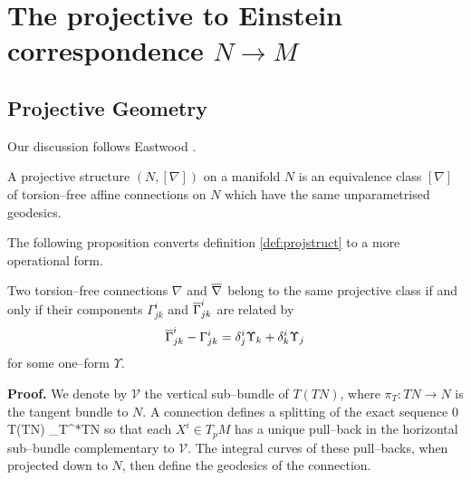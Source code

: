
\chapter{The projective to Einstein correspondence $N\rightarrow M$}
\label{chap:intro2}

\section{Projective Geometry}\label{sec:projgeom}

Our discussion follows Eastwood \cite{Eastwood}.

\begin{defi}\label{def:projstruct} A projective structure $(N,[\nabla])$
on a manifold $N$ is an equivalence class $[\nabla]$ of torsion--free affine connections on $N$ which have the same unparametrised geodesics.
\end{defi}

The following proposition converts definition \ref{def:projstruct} to a more operational form.

\begin{prop} Two torsion--free connections $\nabla$ and $\overline{\nabla}$ belong to the same projective class if and only if their components $\Gamma^i_{jk}$ and $\overline{\Gamma}^i_{jk}$ are related by
\begin{equation}
\overline{\Gamma}^i_{jk} - \Gamma^i_{jk} = \delta_{j}^{i}\Upsilon_{k}+\delta_{k}^{i}\Upsilon_{j}\label{eq:proj_change}
\end{equation}
for some one--form $\Upsilon.$
\end{prop}

{\bf Proof.} We denote by $\mathcal{V}$ the vertical sub--bundle of $T(TN)$, where $\pi_T:TN\rightarrow N$ is the tangent bundle to $N$. A connection defines a splitting of the exact sequence
\be \label{eq:TTMsequence}
0 \longrightarrow {} \longrightarrow T(TN) \longrightarrow \pi_T^*TN 
\ee
so that each $X^i\in T_pM$ has a unique pull--back in the horizontal sub--bundle complementary to $\mathcal{V}$. The integral curves of these pull--backs, when projected down to $N$, then define the geodesics of the connection.

